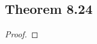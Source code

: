 \documentclass[../../main.tex]{subfiles}
\begin{document}
\subsection{Theorem 8.24}
\begin{wts}

\end{wts}
\begin{proof}

\end{proof}
\end{document}
